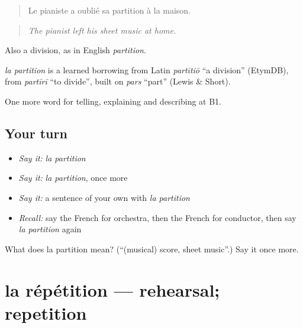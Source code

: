 \begin{quote}
Le pianiste a oublié sa partition à la maison.
\end{quote}

\begin{quote}
\emph{The pianist left his sheet music at home.}
\end{quote}

Also a division, as in English \emph{partition}.

\begin{cousinweb}
\emph{la partition} is a learned borrowing from Latin \emph{partītiō} \textquotedblleft{}a division\textquotedblright{} (EtymDB), from \emph{partīrī} \textquotedblleft{}to divide\textquotedblright{}, built on \emph{pars} \textquotedblleft{}part\textquotedblright{} (Lewis \& Short).
\end{cousinweb}

\begin{grammarlens}[title={What you've built}]
One more word for telling, explaining and describing at B1.
\end{grammarlens}

\subsection*{Your turn}
\begin{itemize}
\raggedright
  \item \emph{Say it:} \emph{la partition}
  \item \emph{Say it:} \emph{la partition}, once more
  \item \emph{Say it:} a sentence of your own with \emph{la partition}
  \item \emph{Recall:} say the French for orchestra, then the French for conductor, then say \emph{la partition} again
\end{itemize}

\begin{tcolorbox}[breakable,colback=teal!4,colframe=teal!35!black,title={Before you move on}]
What does la partition mean? (\textquotedblleft{}(musical) score, sheet music\textquotedblright{}.) Say it once more.
\end{tcolorbox}
\section[la répétition]{la répétition — rehearsal; repetition}

\label{lesson:FR-C513-repetition}



